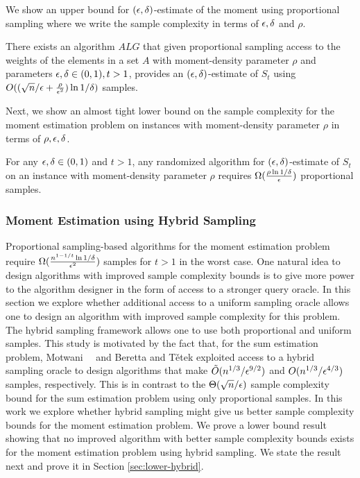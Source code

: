 We show an upper bound for $(\epsilon,\delta)$-estimate of the moment using proportional sampling where we write the sample complexity in terms of $\epsilon,\delta$ and $\rho$.

\begin{thm} There exists an algorithm $ALG$ that given proportional sampling access to the weights of the elements in a set $A$ with moment-density parameter $\rho$ and parameters $\epsilon,\delta\in (0,1), t>1$, provides an $(\epsilon,\delta)$-estimate of $S_t$ using $O((\sqrt{n}/\epsilon+\frac{\rho}{\epsilon^2})\ln 1/\delta)$ samples. \end{thm}

Next, we show an almost tight lower bound on the sample complexity for the moment estimation problem on instances with moment-density parameter $\rho$ in terms of $\rho,\epsilon,\delta$.

\begin{thm} For any $\epsilon,\delta\in (0,1)$ and $t>1$, any randomized algorithm for $(\epsilon,\delta)$-estimate of $S_t$ on an instance with moment-density parameter $\rho$ requires $\Omega(\frac{\rho \ln 1/\delta}{\epsilon })$ proportional samples. \end{thm}


\subsubsection{Moment Estimation using Hybrid Sampling}

Proportional sampling-based algorithms for the moment estimation problem require $\Omega(\frac{n^{1-1/t}\ln1/\delta}{\epsilon^2})$ samples for $t>1$ in the worst case. One natural idea to design algorithms with improved sample complexity bounds is to give more power to the algorithm designer in the form of access to a stronger query oracle. In this section we explore whether additional access to a uniform sampling oracle allows one to design an algorithm with improved sample complexity for this problem. The hybrid sampling framework allows one to use both proportional and uniform samples. This study is motivated by the fact that, for the sum estimation problem, Motwani~\etal~\cite{MPX2007} and Beretta and T{\v{e}}tek \cite{BT2022} exploited access to a hybrid sampling oracle to design algorithms that make $\tilde{O}(n^{1/3}/\epsilon^{9/2})$ and $O(n^{1/3}/\epsilon^{4/3})$ samples, respectively. This is in contrast to the $\Theta(\sqrt{n}/\epsilon)$ sample complexity bound for the sum estimation problem using only proportional samples. In this work we explore whether hybrid sampling might give us better sample complexity bounds for the moment estimation problem. We prove a lower bound result showing that no improved algorithm with better sample complexity bounds exists for the moment estimation problem using hybrid sampling. We state the result next and prove it in Section \ref{sec:lower-hybrid}.

